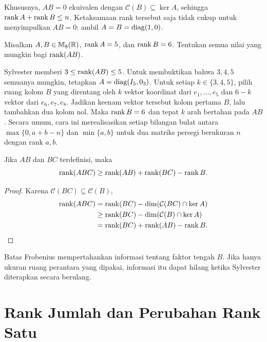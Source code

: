 Khususnya, $AB=0$ ekuivalen dengan $\mathcal C(B)\subseteq\ker A$,
sehingga $\operatorname{rank} A+\operatorname{rank} B\le n$.
Ketaksamaan rank tersebut saja tidak cukup untuk menyimpulkan $AB=0$:
ambil $A=B=\operatorname{diag}(1,0)$.

\begin{exam}
    Misalkan $A,B\in\mathbb{M}_8(\mathbb{R})$, $\operatorname{rank} A=5$, dan $\operatorname{rank} B=6$.
    Tentukan semua nilai yang mungkin bagi $\operatorname{rank}(AB)$.
\end{exam}
\begin{solution}
    Sylvester memberi $3\le\operatorname{rank}(AB)\le5$.
    Untuk membuktikan bahwa $3,4,5$ semuanya mungkin, tetapkan
    $A=\operatorname{diag}(I_5,0_3)$. Untuk setiap $k\in\{3,4,5\}$, pilih ruang
    kolom $B$ yang direntang oleh $k$ vektor koordinat dari
    $e_1,\ldots,e_5$ dan $6-k$ vektor dari $e_6,e_7,e_8$.
    Jadikan keenam vektor tersebut kolom pertama $B$, lalu tambahkan
    dua kolom nol. Maka $\operatorname{rank} B=6$ dan tepat $k$ arah bertahan pada $AB$.
    Secara umum, cara ini merealisasikan setiap bilangan bulat antara
    $\max\{0,a+b-n\}$ dan $\min\{a,b\}$ untuk dua matriks persegi
    berukuran $n$ dengan rank $a,b$.
\end{solution}

\begin{teorema}
    Jika $AB$ dan $BC$ terdefinisi, maka
    \[
        \operatorname{rank}(ABC)\ge\operatorname{rank}(AB)+\operatorname{rank}(BC)-\operatorname{rank} B.
    \]
\end{teorema}
\begin{proof}
    Karena $\mathcal C(BC)\subseteq\mathcal C(B)$,
    \begin{align*}
        \operatorname{rank}(ABC)
        &=\operatorname{rank}(BC)-\dim(\mathcal C(BC)\cap\ker A)\\
        &\ge\operatorname{rank}(BC)-\dim(\mathcal C(B)\cap\ker A)\\
        &=\operatorname{rank}(BC)+\operatorname{rank}(AB)-\operatorname{rank} B.
    \end{align*}
\end{proof}

Batas Frobenius mempertahankan informasi tentang faktor tengah $B$.
Jika hanya ukuran ruang perantara yang dipakai, informasi itu dapat
hilang ketika Sylvester diterapkan secara berulang.

\section{Rank Jumlah dan Perubahan Rank Satu}
\label{rank:jumlah}


